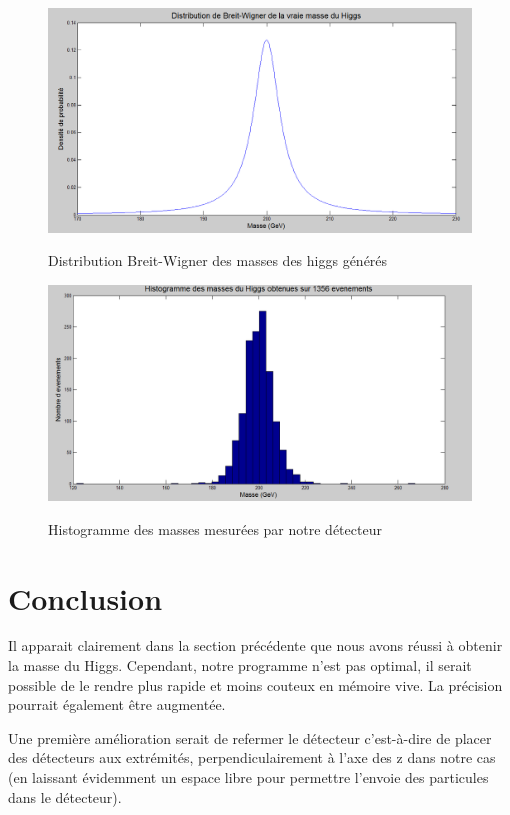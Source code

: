 \documentclass[11pt]{article}
\begin{document}
\begin{figure}[h!]
\caption{Distribution Breit-Wigner des masses des higgs générés}
\includegraphics[scale=0.4]{images/bwmH.png}
\label{bw}
\end{figure}

\begin{figure}
\caption{Histogramme des masses mesurées par notre détecteur}
\includegraphics[scale=0.4]{images/histmH.png}
\label{hist}
\end{figure}


\newpage
\section{Conclusion}
 Il apparait clairement dans la section pr\'ec\'edente que nous avons r\'eussi \`a obtenir la masse du Higgs.
Cependant, notre programme n'est pas optimal, il serait possible de le rendre plus rapide et 
moins couteux en m\'emoire vive. La pr\'ecision pourrait \'egalement être augment\'ee. 

Une première amélioration serait de refermer le d\'etecteur c'est-à-dire de placer des d\'etecteurs aux extrémités, 
perpendiculairement à l'axe des z dans notre cas (en laissant évidemment un espace libre pour permettre l'envoie des 
particules dans le d\'etecteur). 
\end{document}
